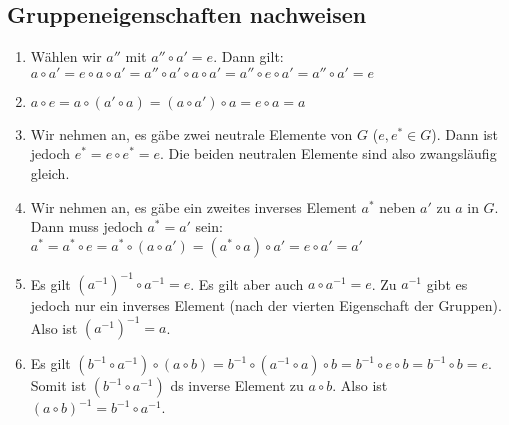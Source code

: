 \subsection{Gruppeneigenschaften nachweisen}\label{subsec:gruppeneigenschaften-nachweisen}
\begin{enumerate}
    \item Wählen wir $a''$ mit $a''\circ a'=e$.
    Dann gilt: $a\circ a'=e\circ a\circ a'=a''\circ a'\circ a\circ a'=a''\circ e\circ a'=a''\circ a'=e$
    \item $a\circ e=a\circ(a'\circ a)=(a\circ a')\circ a=e\circ a=a$
    \item Wir nehmen an, es gäbe zwei neutrale Elemente von $G$ ($e,e^*\in G$).
    Dann ist jedoch $e^*=e\circ e^*=e$.
    Die beiden neutralen Elemente sind also zwangsläufig gleich.
    \item Wir nehmen an, es gäbe ein zweites inverses Element $a^*$ neben $a'$ zu $a$ in $G$.
    Dann muss jedoch $a^*=a'$ sein: $a^*=a^*\circ e=a^*\circ (a\circ a')=(a^*\circ a)\circ a'=e\circ a'=a'$
    \item Es gilt $(a^{-1})^{-1}\circ a^{-1}=e$.
    Es gilt aber auch  $a\circ a^{-1}=e$.
    Zu $a^{-1}$ gibt es jedoch nur ein inverses Element (nach der vierten Eigenschaft der Gruppen).
    Also ist $(a^{-1})^{-1}=a$.
    \item Es gilt $(b^{-1}\circ a^{-1})\circ(a\circ b)=b^{-1}\circ(a^{-1}\circ a)\circ b=b^{-1}\circ e\circ b=b^{-1}\circ b=e$.
    Somit ist $(b^{-1}\circ a^{-1})$ ds inverse Element zu $a\circ b$.
    Also ist $(a\circ b)^{-1}=b^{-1}\circ a^{-1}$.
\end{enumerate}
